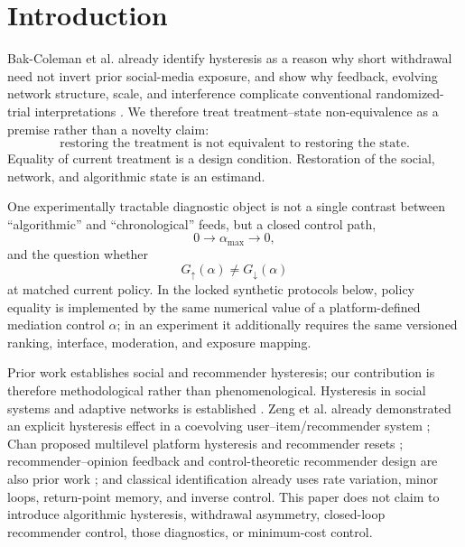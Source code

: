 \documentclass[pdflatex,sn-mathphys-num]{sn-jnl}
\newcommand{\alphamax}{\alpha_{\max}}
\newcommand{\Gup}{G_{\uparrow}}
\newcommand{\Gdown}{G_{\downarrow}}
\begin{document}

\maketitle

\section{Introduction}

Bak-Coleman et al. already identify hysteresis as a reason why short withdrawal need not invert prior social-media exposure, and show why feedback, evolving network structure, scale, and interference complicate conventional randomized-trial interpretations \cite{bakcoleman2025actionable,bakcoleman2025rct}. We therefore treat treatment--state non-equivalence as a premise rather than a novelty claim:
\begin{equation}
\boxed{\text{restoring the treatment is not equivalent to restoring the state}.}
\label{eq:principle}
\end{equation}
Equality of current treatment is a design condition. Restoration of the social, network, and algorithmic state is an estimand.

One experimentally tractable diagnostic object is not a single contrast between ``algorithmic'' and ``chronological'' feeds, but a closed control path,
\begin{equation}
0\longrightarrow\alphamax\longrightarrow0,
\end{equation}
and the question whether
\begin{equation}
\Gup(\alpha)\neq\Gdown(\alpha)
\end{equation}
at matched current policy. In the locked synthetic protocols below, policy equality is implemented by the same numerical value of a platform-defined mediation control $\alpha$; in an experiment it additionally requires the same versioned ranking, interface, moderation, and exposure mapping.

Prior work establishes social and recommender hysteresis; our contribution is therefore methodological rather than phenomenological. Hysteresis in social systems and adaptive networks is established \cite{sznajdweron2024toward,oestereich2020hysteresis,nowak2020threshold,macy2021polarization,su2017contagion,chen2019vaccine,graham2020sociology,maia2021adaptive,asikainen2020cumulative}. Zeng et al. already demonstrated an explicit hysteresis effect in a coevolving user--item/recommender system \cite{zeng2015mutual}; Chan proposed multilevel platform hysteresis and recommender resets \cite{chan2026brake}; recommender--opinion feedback and control-theoretic recommender design are also prior work \cite{davidson2026closedloop,depasquale2026control,mariano2026optimal,mariano2026pathological}; and classical identification already uses rate variation, minor loops, return-point memory, and inverse control. This paper does not claim to introduce algorithmic hysteresis, withdrawal asymmetry, closed-loop recommender control, those diagnostics, or minimum-cost control.
\end{document}
